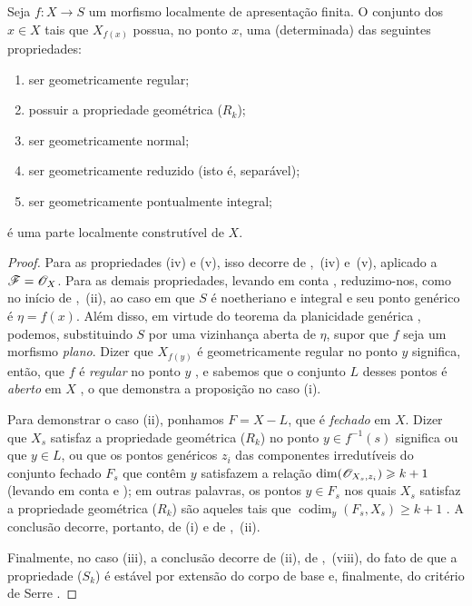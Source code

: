 \begin{proposition}[9.9.4]
\label{IV.9.9.4}
Seja $f:X\to S$ um morfismo localmente de apresentação finita.
O conjunto dos $x\in X$ tais que $X_{f(x)}$ possua, no ponto $x$, uma (determinada) das seguintes propriedades:
\begin{enumerate}[label=(\roman*)]
  \item ser geometricamente regular;
  \item possuir a propriedade geométrica ($R_k$);
  \item ser geometricamente normal;
  \item ser geometricamente reduzido (isto é, separável);
  \item ser geometricamente pontualmente integral;
\end{enumerate}
é uma parte localmente construtível de $X$.
\end{proposition}

\begin{proof}
\label{IV.9.9.4-proof}
Para as propriedades (iv) e (v), isso decorre de ,~(iv) e~(v), aplicado a $\mathscr{F}=\mathscr{O}_X$.
Para as demais propriedades, levando em conta , reduzimo-nos, como no início de ,~(ii), ao caso em que $S$ é noetheriano e integral e seu ponto genérico é $\eta=f(x)$.
Além disso, em virtude do teorema da planicidade genérica , podemos, substituindo $S$ por uma vizinhança aberta de $\eta$, supor que $f$ seja um morfismo \emph{plano}.
Dizer que $X_{f(y)}$ é geometricamente regular no ponto $y$ significa, então, que $f$ é \emph{regular} no ponto $y$ , e sabemos que o conjunto $L$ desses pontos é \emph{aberto} em $X$ , o que demonstra a proposição no caso (i).

Para demonstrar o caso (ii), ponhamos $F=X-L$, que é \emph{fechado} em $X$.
Dizer que $X_s$
satisfaz a propriedade geométrica ($R_k$) no ponto $y\in f^{-1}(s)$ significa ou que $y\in L$, ou que os pontos genéricos $z_i$ das componentes irredutíveis do conjunto fechado $F_s$ que contêm $y$ satisfazem a relação $\dim(\mathscr{O}_{X_s,z_i})\geqslant k+1$ (levando em conta  e ); em outras palavras, os pontos $y\in F_s$ nos quais $X_s$ satisfaz a propriedade geométrica ($R_k$) são aqueles tais que $\operatorname{codim}_y(F_s,X_s)\geqslant k+1$ .
A conclusão decorre, portanto, de (i) e de ,~(ii).

Finalmente, no caso (iii), a conclusão decorre de (ii), de ,~(viii), do fato de que a propriedade ($S_k$) é estável por extensão do corpo de base  e, finalmente, do critério de Serre .
\end{proof}

